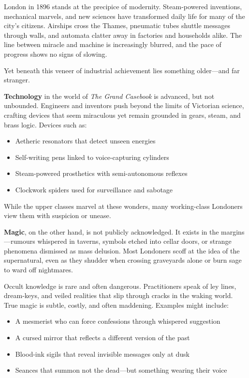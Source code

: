 London in 1896 stands at the precipice of modernity. Steam-powered inventions, mechanical marvels, and new sciences have transformed daily life for many of the city's citizens. Airships cross the Thames, pneumatic tubes shuttle messages through walls, and automata clatter away in factories and households alike. The line between miracle and machine is increasingly blurred, and the pace of progress shows no signs of slowing.

Yet beneath this veneer of industrial achievement lies something older—and far stranger.

\textbf{Technology} in the world of \textit{The Grand Casebook} is advanced, but not unbounded. Engineers and inventors push beyond the limits of Victorian science, crafting devices that seem miraculous yet remain grounded in gears, steam, and brass logic. Devices such as:
\begin{itemize}
    \item Aetheric resonators that detect unseen energies
    \item Self-writing pens linked to voice-capturing cylinders
    \item Steam-powered prosthetics with semi-autonomous reflexes
    \item Clockwork spiders used for surveillance and sabotage
\end{itemize}
While the upper classes marvel at these wonders, many working-class Londoners view them with suspicion or unease.

\textbf{Magic}, on the other hand, is not publicly acknowledged. It exists in the margins—rumours whispered in taverns, symbols etched into cellar doors, or strange phenomena dismissed as mass delusion. Most Londoners scoff at the idea of the supernatural, even as they shudder when crossing graveyards alone or burn sage to ward off nightmares.

Occult knowledge is rare and often dangerous. Practitioners speak of ley lines, dream-keys, and veiled realities that slip through cracks in the waking world. True magic is subtle, costly, and often maddening. Examples might include:
\begin{itemize}
    \item A mesmerist who can force confessions through whispered suggestion
    \item A cursed mirror that reflects a different version of the past
    \item Blood-ink sigils that reveal invisible messages only at dusk
    \item Seances that summon not the dead—but something wearing their voice
\end{itemize}

